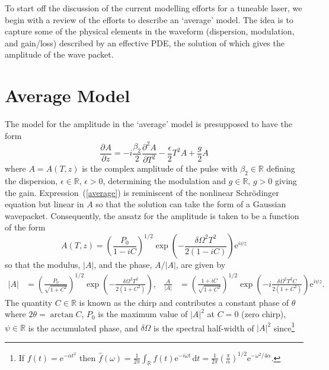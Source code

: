 \documentclass[12pt]{article}
\title{}
\author{Brady Metherall \& C.\ Sean Bohun}
\providecommand{\df}{\textrm{d}}
\newcommand{\pdiff}[3][]{\frac{\partial^{#1}#2}{\partial{#3}^{#1}}}
\begin{document}
\maketitle

\noindent
To start off the discussion of the current modelling efforts for a tuneable laser, we begin with a review of the efforts to describe an `average' model. The idea is to capture some of the physical elements in the waveform (dispersion, modulation, and gain/loss) described by an effective PDE, the solution of which gives the amplitude of the wave packet.

\section{Average Model}
The model for the amplitude in the `average' model is presupposed to have the form
\begin{equation}
\label{average}
	\pdiff{A}{z} = -i\frac{\beta_2}{2}\pdiff[2]{A}{T} - \frac{\epsilon}{2}T^2 A + \frac{g}{2}A
\end{equation}
where $A=A(T,z)$ is the complex amplitude of the pulse with $\beta_2 \in \mathbb{R}$ defining the dispersion, $\epsilon \in \mathbb{R}$, $\epsilon > 0$, determining the modulation and $g \in \mathbb{R}$, $g > 0$ giving the gain. Expression~(\ref{average}) is reminiscent of the nonlinear Schr\"odinger equation but linear in $A$ so that the solution can take the form of a Gaussian wavepacket. Consequently, the ansatz for the amplitude is taken to be a function of the form
\begin{equation}
\label{ansatz}
	A(T,z) = \left(\frac{P_0}{1-i C}\right)^{1/2}\exp
	\left(-\frac{\delta \Omega^2 T^2}{2(1-i C)}\right)\textrm{e}^{i\psi z}
\end{equation}
so that the modulus, $|A|$, and the phase, $A/|A|$, are given by
\begin{align*}
	\left|A\right| &= \left(\frac{P_0}{\sqrt{1 + C^2}}\right)^{1/2}
	\exp\left(-\frac{\delta \Omega^2 T^2}{2(1 + C^2)}\right),&
	\frac{A}{|A|} &= \left(\frac{1+iC}{\sqrt{1+C^2}}\right)^{1/2}\exp
	\left(-i\frac{\delta \Omega^2 T^2 C}{2(1+C^2)}\right)\textrm{e}^{i\psi z}.
\end{align*}
The quantity $C \in \mathbb{R}$ is known as the chirp and contributes a constant phase of $\theta$ where $2\theta = \arctan C$, $P_0$ is the maximum value of $|A|^2$ at $C=0$ (zero chirp), $\psi \in \mathbb{R}$ is the accumulated phase, and $\delta\Omega$ is the spectral half-width of $|A|^2$ since\footnote{If $f(t) = \textrm{e}^{-\alpha t^2}$ then $\hat{f}(\omega) = \frac{1}{2\pi}\int_{\mathbb{R}} f(t)\textrm{e}^{-i\omega t}\, \df t = \frac{1}{2\pi} (\frac{\pi}{\alpha})^{1/2}\textrm{e}^{-\omega^2/4\alpha}$.}
\end{document}
